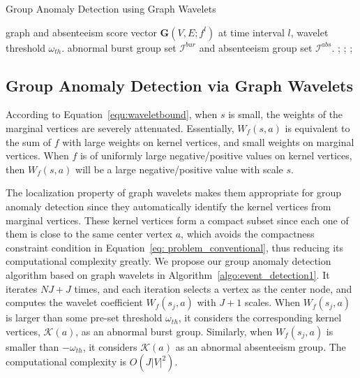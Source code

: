 \documentclass[twoside,leqno,twocolumn]{article}
\begin{document}
\begin{algorithm}[t]
\centering
\caption{Group Anomaly Detection using Graph Wavelets}
{\footnotesize \begin{algorithmic}[1]
 graph and absenteeism score vector $\mathbf{G}(V,E;f^l)$ at time interval $l$, wavelet threshold $\omega_{th}$.
 abnormal burst group set $\mathcal{I}^{bur}$ and absenteeism group set $\mathcal{I}^{abs}$.	;
;
	    ;
	    \ENDIF
	
	    \ENDIF	
	
\ENDFOR	
{}
\end{algorithmic}}
\label{algo:event_detection1}
\end{algorithm}



\subsection{Group Anomaly Detection via Graph Wavelets}
\label{sec:Group_Anomaly_Detection_via_graph_wavelet}
According to Equation~\ref{equ:waveletbound}, when $s$ is small, the weights of the marginal vertices are severely attenuated.
Essentially, $W_f(s,a)$ is equivalent to the sum of $f$ with large weights on kernel vertices, and small weights on marginal vertices.
When $f$ is of uniformly large negative/positive values on kernel vertices, then $W_f(s,a)$ will be a large negative/positive value with scale $s$.

The localization property of graph wavelets makes them appropriate for group anomaly detection since they automatically identify the kernel vertices from marginal vertices. These kernel vertices form a compact subset since each one of them is close to the same center vertex $a$, which avoids the compactness constraint condition in Equation~\ref{eq: problem_conventional}, thus reducing
its computational complexity greatly. We propose our group anomaly detection algorithm based on graph wavelets in Algorithm~\ref{algo:event_detection1}. It iterates $NJ+J$ times, and each iteration selects a vertex as the center node, and computes the wavelet coefficient $W_f(s_j, a)$ with $J+1$ scales. When $W_f(s_j, a)$ is larger than some pre-set threshold $\omega_{th}$, it considers the corresponding kernel vertices, $\mathcal{K}(a)$, as an abnormal burst group. Similarly, when $W_f(s_j, a)$ is smaller than $-\omega_{th}$, it considers $\mathcal{K}(a)$ as an abnormal absenteeism group. The computational complexity is $O(J|V|^2)$.
\end{document}
